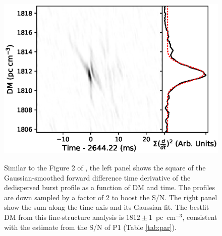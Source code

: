 \begin{figure}%
\centering
\includegraphics[scale=0.7]{DM_struct.eps} \\ 
\caption{\label{fig:DMcurve} 
{Similar to the Figure 2 of \citet{hessels19}, the left panel shows the
square of the Gaussian-smoothed forward difference time derivative of the
dedispersed burst profile as a function of DM and time. The profiles are
down sampled by a factor of 2 to boost the S/N. The right panel show the
sum along the time axis and its Gaussian fit. The bestfit DM from this
fine-structure analysis is $1812\pm1$~pc~cm$^{-3}$, consistent with the
estimate from the S/N of P1 (Table \ref{tab:par}).}
}
\end{figure} 

